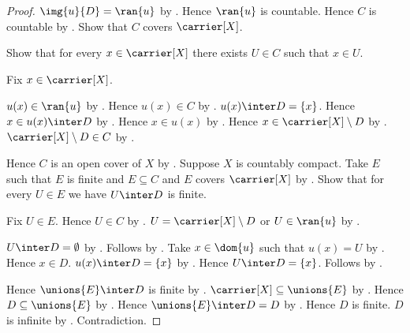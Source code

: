 \begin{proof}
    $\img{u}{D}=\ran{u}$ by .
    Hence $\ran{u}$ is countable.
    Hence $C$ is countable by .
    Show that $C$ covers $\carrier[X]$.
    \begin{subproof}
        Show that for every $x\in\carrier[X]$ there exists $U\in C$
            such that $x\in U$.
        \begin{subproof}
            Fix $x\in\carrier[X]$.
            \begin{byCase}
                    $u(x)\in\ran{u}$ by .
                    Hence $u(x)\in C$ by .
                    $u(x)\inter D=\{x\}$.
                    Hence $x\in u(x)\inter D$ by .
                    Hence $x\in u(x)$ by .
                    Hence $x\in\carrier[X]\setminus D$ by .
                    $\carrier[X]\setminus D\in C$ by .
            \end{byCase}
        \end{subproof}
    \end{subproof}
    Hence $C$ is an open cover of $X$ by .
    Suppose $X$ is countably compact.
    Take $E$ such that $E$ is finite and $E\subseteq C$ and
        $E$ covers $\carrier[X]$ by .
    Show that for every $U\in E$ we have $U\inter D$ is finite.
    \begin{subproof}
        Fix $U\in E$.
        Hence $U\in C$ by .
        $U=\carrier[X]\setminus D$ or $U\in\ran{u}$
            by .
        \begin{byCase}
                $U\inter D=\emptyset$ by
                    .
                Follows by .
                Take $x\in\dom{u}$ such that $u(x)=U$
                    by .
                Hence $x\in D$.
                $u(x)\inter D=\{x\}$ by \auto.
                Hence $U\inter D=\{x\}$.
                Follows by .
        \end{byCase}
    \end{subproof}
    Hence $\unions{E}\inter D$ is finite
        by .
    $\carrier[X]\subseteq\unions{E}$ by .
    Hence $D\subseteq\unions{E}$ by .
    Hence $\unions{E}\inter D=D$ by .
    Hence $D$ is finite.
    $D$ is infinite by .
    Contradiction.
\end{proof}
